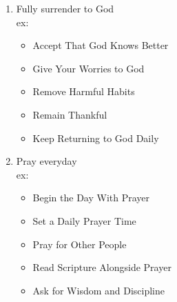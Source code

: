 \documentclass{article}%
\begin{document}
\begin{enumerate}
    \begin{itemize}
        \item Start With Gratitude
        \item Speak Honestly
        \item Ask for Guidance
        \item Confess Mistakes
        \item Stay Humble
        \item Trust God’s Timing
    \end{itemize}
    \item Fully surrender to God
    \\ex:
    \begin{itemize}
        \item Accept That God Knows Better
        \item Give Your Worries to God
        \item Remove Harmful Habits
        \item Remain Thankful
        \item Keep Returning to God Daily
    \end{itemize}
    \item Pray everyday
    \\ex: 
    \begin{itemize}
        \item Begin the Day With Prayer
        \item Set a Daily Prayer Time
        \item Pray for Other People
        \item Read Scripture Alongside Prayer
        \item Ask for Wisdom and Discipline
    \end{itemize}
\end{enumerate}
\end{document}
